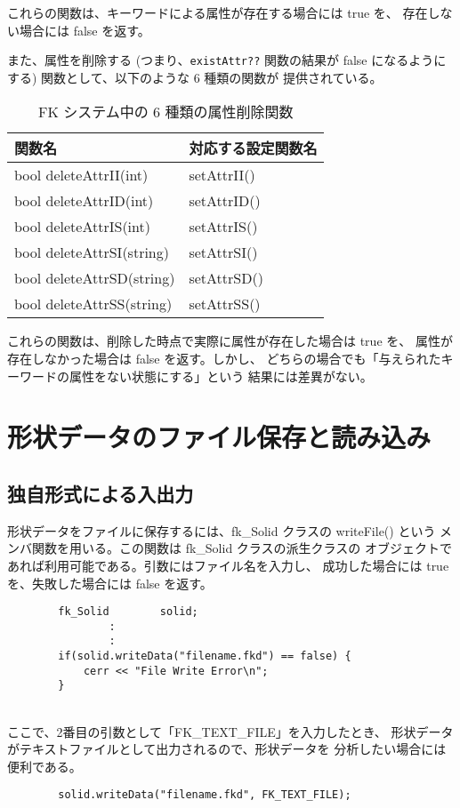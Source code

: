 これらの関数は、キーワードによる属性が存在する場合には true を、
存在しない場合には false を返す。

また、属性を削除する (つまり、\verb+existAttr??+ 関数の結果が
false になるようにする) 関数として、以下のような 6 種類の関数が
提供されている。

\begin{table}[H]
\caption{FK システム中の 6 種類の属性削除関数}
\label{tbl:attr4}
\begin{center}
\begin{tabular}{|l|l|}
\hline
関数名 & 対応する設定関数名 \\ \hline
bool deleteAttrII(int)		& setAttrII()	\\ \hline
bool deleteAttrID(int)		& setAttrID()	\\ \hline
bool deleteAttrIS(int)		& setAttrIS()	\\ \hline
bool deleteAttrSI(string)	& setAttrSI()	\\ \hline
bool deleteAttrSD(string)	& setAttrSD()	\\ \hline
bool deleteAttrSS(string)	& setAttrSS()	\\ \hline
\end{tabular}
\end{center}
\end{table}

これらの関数は、削除した時点で実際に属性が存在した場合は true を、
属性が存在しなかった場合は false を返す。しかし、
どちらの場合でも「与えられたキーワードの属性をない状態にする」という
結果には差異がない。

\section{形状データのファイル保存と読み込み}

\subsection{独自形式による入出力}
形状データをファイルに保存するには、fk\_Solid クラスの writeFile() という
メンバ関数を用いる。この関数は fk\_Solid クラスの派生クラスの
オブジェクトであれば利用可能である。引数にはファイル名を入力し、
成功した場合には true を、失敗した場合には false を返す。
\\
\begin{breakbox}
\begin{verbatim}
        fk_Solid        solid;
                :
                :
        if(solid.writeData("filename.fkd") == false) {
            cerr << "File Write Error\n";
        }
\end{verbatim}
\end{breakbox}
~ \\
ここで、2番目の引数として「FK\_TEXT\_FILE」を入力したとき、
形状データがテキストファイルとして出力されるので、形状データを
分析したい場合には便利である。
\\
\begin{screen}
\begin{verbatim}
        solid.writeData("filename.fkd", FK_TEXT_FILE);
\end{verbatim}
\end{screen}
~ \\

